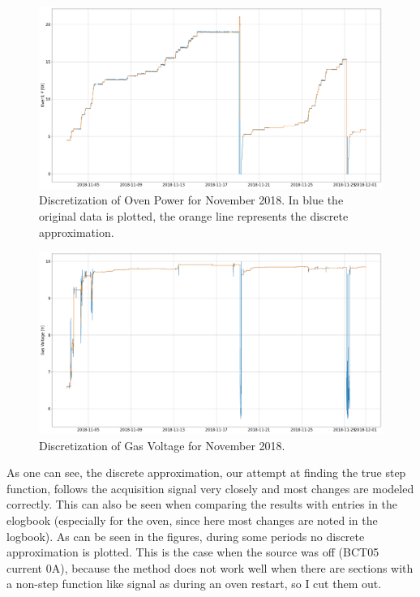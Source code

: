 \documentclass[12pt,a4paper]{article}
\begin{document}
\begin{figure}
\centering
\includegraphics[width=!,totalheight=!,scale=0.38, angle=90]{images/oven_discrete_nov2018.png}
\caption{Discretization of Oven Power for November 2018. In blue the original data is plotted, the orange line represents the discrete
approximation.}
\end{figure}

\begin{figure}
\centering
\includegraphics[width=!,totalheight=!,scale=0.38, angle=90]{images/gas_discrete_nov2018.png}
\caption{Discretization of Gas Voltage for November 2018.}
\end{figure}

As one can see, the discrete approximation, our attempt at finding the true step function, follows the acquisition signal very closely and most changes are modeled correctly. This can also be seen when comparing the results with entries in the elogbook (especially for the oven, since here most changes are noted in the logbook). As can be seen in the figures, during some periods no discrete approximation is plotted. This is the case when the source was off (BCT05 current 0A), because the method does not work well when there are sections with a non-step function like signal as during an oven restart, so I cut them out.
\end{document}
